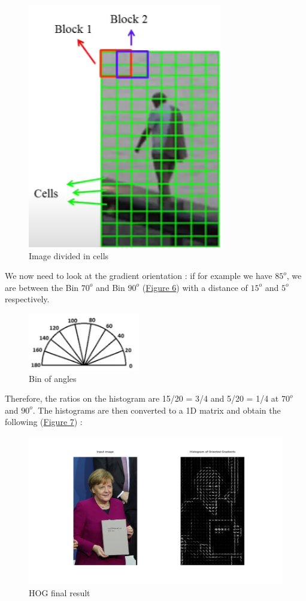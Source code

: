 \documentclass{article}
\begin{document}
\begin{figure}[!ht]
  \centering
  \includegraphics[scale = 1.15]{HOG/cells.PNG}
  \caption{Image divided in cells}
  \label{Figure 5}
\end{figure}

We  now need to look at the gradient orientation : if for example we have $85^o$, we are between the Bin $70^o$ and Bin $90^o$ (\hyperref[Figure 6]{Figure 6}) with a distance of $15^o$ and $5^o$ respectively. 

\begin{figure}[!ht]
  \centering
  \includegraphics[scale = 2]{HOG/angle_bin.PNG}
  \caption{Bin of angles}
  \label{Figure 6}
\end{figure}

Therefore, the ratios on the histogram are 15/20 = 3/4 and 5/20 = 1/4 at $70^o$ and $90^o$. The histograms are then converted to a 1D matrix and obtain the following (\hyperref[Figure 7]{Figure 7}) :

\begin{figure}[!ht]
  \centering
  \includegraphics[scale = 0.4]{HOG/example.jpeg}
  \caption{HOG final result}
  \label{Figure 7}
\end{figure}
\end{document}
